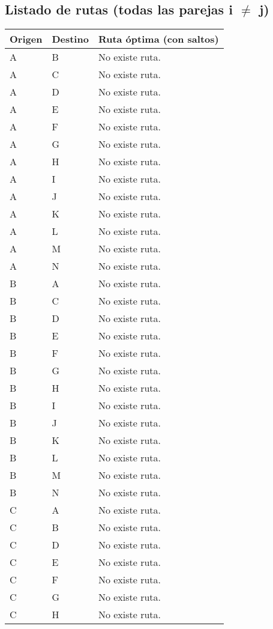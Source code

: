 \documentclass{article}
\begin{document}
\subsection*{Listado de rutas (todas las parejas i $\neq$ j)}
\begin{longtable}{llp{}}
\toprule
\textbf{Origen} & \textbf{Destino} & \textbf{Ruta óptima (con saltos)}\\\midrule
A & B & No existe ruta.\\
A & C & No existe ruta.\\
A & D & No existe ruta.\\
A & E & No existe ruta.\\
A & F & No existe ruta.\\
A & G & No existe ruta.\\
A & H & No existe ruta.\\
A & I & No existe ruta.\\
A & J & No existe ruta.\\
A & K & No existe ruta.\\
A & L & No existe ruta.\\
A & M & No existe ruta.\\
A & N & No existe ruta.\\
B & A & No existe ruta.\\
B & C & No existe ruta.\\
B & D & No existe ruta.\\
B & E & No existe ruta.\\
B & F & No existe ruta.\\
B & G & No existe ruta.\\
B & H & No existe ruta.\\
B & I & No existe ruta.\\
B & J & No existe ruta.\\
B & K & No existe ruta.\\
B & L & No existe ruta.\\
B & M & No existe ruta.\\
B & N & No existe ruta.\\
C & A & No existe ruta.\\
C & B & No existe ruta.\\
C & D & No existe ruta.\\
C & E & No existe ruta.\\
C & F & No existe ruta.\\
C & G & No existe ruta.\\
C & H & No existe ruta.\\

\end{longtable}
\end{document}
